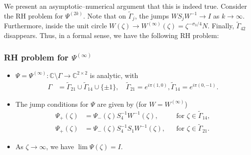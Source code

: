 \documentclass[11pt,fleqn]{article}
\numberwithin{equation}{section}
\begin{document}
    We present an asymptotic--numerical argument that this is indeed true.  Consider the RH problem for $\Psi^{(2k)}$.
      Note that on $\tilde \Gamma_j$, the jumps $W S_j W^{-1} \rightarrow I$  as $k \rightarrow \infty$.  Furthermore, inside the unit circle $W(\zeta) \rightarrow W^{(\infty)}(\zeta) = \zeta^{-\sigma_3/4} N$.  Finally, $\tilde \Gamma_{42}$
     disappears.  Thus, in a formal sense, we have the following RH problem:

\subsubsection*{RH problem for $\Psi^{(\infty)}$}

\begin{itemize}
    \item[(a)] $\Psi = \Psi^{(\infty)}: \mathbb C\setminus \Gamma\to \mathbb C^{2\times 2}$ is analytic, with
%
     \begin{align*}
     \Gamma &= \tilde \Gamma_{21} \cup \tilde\Gamma_{14}\cup\{\pm 1\}, \quad  \tilde \Gamma_{21} = e^{i \pi (1,0)},  \tilde \Gamma_{14}  = e^{i \pi (0,-1)}.
      \end{align*}
%
       \item[(b)] The jump conditions for $\Psi$ are given by (for $W = W^{(\infty)}$)
    \begin{align*}
            \Psi_+(\zeta)&=\Psi_-(\zeta)   S_4^{-1}W^{-1}(\zeta) ,&& \mbox{for $\zeta\in\tilde \Gamma_{14}$},\\
              \Psi_+(\zeta)&=\Psi_-(\zeta) S_4^{-1} S_1 W^{-1}(\zeta) ,&& \mbox{for $\zeta\in\tilde \Gamma_{21}$}.
    \end{align*}
    \item[(c)] As $\zeta\to\infty$, we have $\lim\Psi(\zeta)= I$.
\end{itemize}
\end{document}
